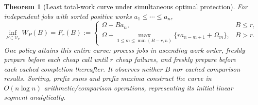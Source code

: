 \documentclass[acmsmall,screen,review,anonymous]{acmart}
\newtheorem{theorem}{Theorem}
\begin{document}
\begin{theorem}[Least total-work curve under simultaneous optimal protection]
\label{thm:jointuniversal}
For independent jobs with sorted positive works $a_1\le\cdots\le a_n$,
\[
 \inf_{P\in\mathcal V_r}W_P(B)=F_r(B):=
 \begin{cases}
  \Omega+B a_n,&B\le r,\\
  \Omega+\displaystyle\max_{1\le m\le\min(B-r,n)}
       \{r a_{n-m+1}+\Omega_m\},&B>r.
 \end{cases}
\]
One policy attains this entire curve: process jobs in ascending work order, freshly prepare before each cheap call until $r$ cheap failures, and freshly prepare before each cached completion thereafter. It observes neither $B$ nor cached comparison results. Sorting, prefix sums and prefix maxima construct the curve in $O(n\log n)$ arithmetic/comparison operations, representing its initial linear segment analytically.
\end{theorem}
\end{document}
